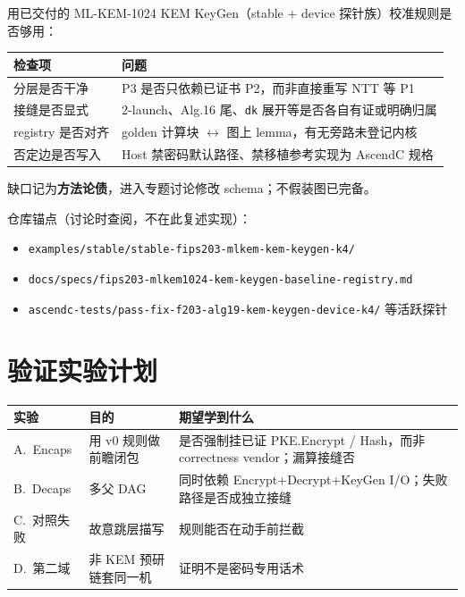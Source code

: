 \documentclass[UTF8,a4paper,11pt]{ctexart}
\begin{document}
用已交付的 ML-KEM-1024 KEM KeyGen（stable + device 探针族）校准规则是否够用：

\begin{table}[h]
  \centering
  \begin{tabular}{@{}L{3.2cm}L{10.5cm}@{}}
    \toprule
    检查项 & 问题 \\
    \midrule
    分层是否干净 & P3 是否只依赖已证书 P2，而非直接重写 NTT 等 P1 \\
    接缝是否显式 & 2-launch、Alg.16 尾、\texttt{dk} 展开等是否各自有证或明确归属 \\
    registry 是否对齐 & golden 计算块 $\leftrightarrow$ 图上 lemma，有无旁路未登记内核 \\
    否定边是否写入 & Host 禁密码默认路径、禁移植参考实现为 AscendC 规格 \\
    \bottomrule
  \end{tabular}
\end{table}

缺口记为\textbf{方法论债}，进入专题讨论修改 schema；不假装图已完备。

仓库锚点（讨论时查阅，不在此复述实现）：
\begin{itemize}
  \item \texttt{examples/stable/stable-fips203-mlkem-kem-keygen-k4/}
  \item \texttt{docs/specs/fips203-mlkem1024-kem-keygen-baseline-registry.md}
  \item \texttt{ascendc-tests/pass-fix-f203-alg19-kem-keygen-device-k4/} 等活跃探针
\end{itemize}

\section{验证实验计划}

\begin{table}[h]
  \centering
  \begin{tabular}{@{}L{2.4cm}L{5.2cm}L{6.4cm}@{}}
    \toprule
    实验 & 目的 & 期望学到什么 \\
    \midrule
    A.\ Encaps & 用 v0 规则做前瞻闭包 & 是否强制挂已证 PKE.Encrypt / Hash，而非 correctness vendor；漏算接缝否 \\
    B.\ Decaps & 多父 DAG & 同时依赖 Encrypt+Decrypt+KeyGen I/O；失败路径是否成独立接缝 \\
    C.\ 对照失败 & 故意跳层描写 & 规则能否在动手前拦截 \\
    D.\ 第二域 & 非 KEM 预研链套同一机 & 证明不是密码专用话术 \\
    \bottomrule
  \end{tabular}
\end{table}
\end{document}

